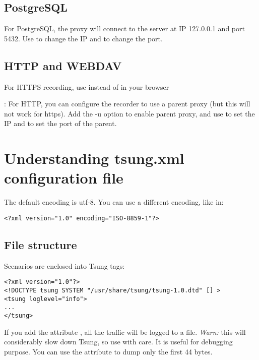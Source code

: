 \documentclass{TSUNG-en}
\begin{document}
\subsection{PostgreSQL}

For PostgreSQL, the proxy will connect to the server at IP 127.0.0.1
and port 5432. Use  to change the IP and
 to change the port.

\subsection{HTTP and WEBDAV}

For HTTPS recording, use  instead of
 in your browser

: For HTTP, you can configure the recorder to
use a parent proxy (but this will not work for https). Add the -u
option to enable parent proxy, and use  to set
the IP and  to set the port of the parent.




\section{Understanding tsung.xml configuration file}

The default encoding is utf-8.  You can use a different encoding, like in:

 \begin{Verbatim}
<?xml version="1.0" encoding="ISO-8859-1"?>
 \end{Verbatim}

\subsection{File structure}

 Scenarios are enclosed into Tsung tags:

 \begin{Verbatim}
<?xml version="1.0"?>
<!DOCTYPE tsung SYSTEM "/usr/share/tsung/tsung-1.0.dtd" [] >
<tsung loglevel="info">
...
</tsung>
 \end{Verbatim}

 If you add the attribute , all the
 traffic will be logged to a file. \emph{Warn:} this will considerably
 slow down Tsung, so use with care. It is useful for debugging
 purpose. You can use the attribute  to
 dump only the first 44 bytes.
\end{document}
